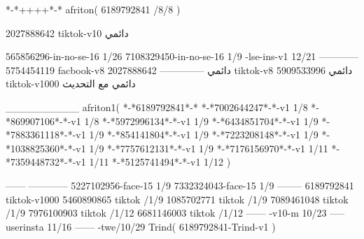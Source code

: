 *-*++++*-*
afriton(
6189792841 /8/8
)

2027888642 tiktok-v10
دائمي

565856296-in-no-se-16 1/26
7108329450-in-no-se-16 1/9
-lse-ins-v1 12/21
------------
5754454119 facbook-v8
دائمي
--------------
2027888642 tiktok-v8
دائمي
5909533996 tiktok-v1000
دائمي مع التحديث

__________
afriton1(
*-*6189792841*-*
*-*7002644247*-*-v1 1/8
*-*869907106*-*-v1 1/8
*-*5972996134*-*-v1 1/9
*-*6434851704*-*-v1 1/9
*-*7883361118*-*-v1 1/9
*-*854141804*-*-v1 1/9
*-*7223208148*-*-v1 1/9
*-*1038825360*-*-v1 1/9
*-*7757612131*-*-v1 1/9
*-*7176156970*-*-v1 1/11
*-*7359448732*-*-v1 1/11
*-*5125741494*-*-v1 1/12
)

------
------------
5227102956-face-15 1/9
7332324043-face-15 1/9
--------
6189792841 tiktok-v1000
5460890865 tiktok /1/9
1085702771 tiktok /1/9
7089461048 tiktok /1/9
7976100903 tiktok /1/12
6681146003 tiktok /1/12
------
-v10-m 10/23
-----
userinsta 11/16
------
-twe/10/29
Trind(
6189792841-Trind-v1 
)
